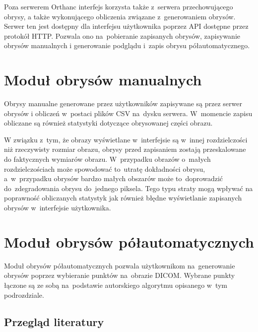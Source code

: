 \documentclass[a4paper,11pt,twoside,openright]{report}
\theoremstyle{definition}
\begin{document}
Poza serwerem Orthanc interfejs korzysta także z~serwera przechowującego obrysy,
a także wykonującego obliczenia związane z~generowaniem obrysów. Serwer ten jest
dostępny dla interfejsu użytkownika poprzez API dostępne przez protokół HTTP.
Pozwala ono na~pobieranie zapisanych obrysów, zapisywanie obrysów manualnych i
generowanie podglądu i~zapis obrysu półautomatycznego.

\section {Moduł obrysów manualnych}

Obrysy manualne generowane przez użytkowników zapisywane są przez serwer obrysów
i obliczeń w~postaci plików CSV na~dysku serwera. W~momencie zapisu obliczane są
również statystyki dotyczące obrysowanej części obrazu.

W związku z~tym, że obrazy wyświetlane w~interfejsie są w~innej rozdzielczości
niż rzeczywisty rozmiar obrazu, obrysy przed zapisaniem zostają przeskalowane do
faktycznych wymiarów obrazu. W~przypadku obrazów o~małych rozdzielczościach może
spowodować to~utratę dokładności obrysu, a~w~przypadku obrysów bardzo małych
obszarów może to~doprowadzić do~zdegradowania 
obrysu do~jednego piksela. Tego typu straty mogą wpływać
na poprawność obliczanych statystyk jak również błędne wyświetlanie zapisanych
obrysów w~interfejsie użytkownika.

\section {Moduł obrysów półautomatycznych}

Moduł obrysów półautomatycznych pozwala użytkownikom na~generowanie
obrysów poprzez wybieranie punktów na~obrazie DICOM. Wybrane punkty łączone są
ze sobą na~podstawie autorskiego algorytmu opisanego w~tym podrozdziale.

\subsection {Przegląd literatury}
\end{document}
